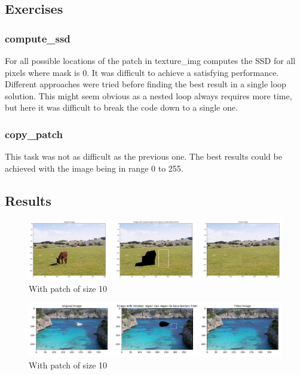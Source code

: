 \documentclass[12pt]{article}
\begin{document}
\subsection{Exercises}
\subsubsection{compute\_ssd}
For all possible locations of the patch in texture\_img computes the SSD for all pixels where mask is 0.
\newline
It was difficult to achieve a satisfying performance. Different approaches were tried before finding the best result
in a single loop solution. This might seem obvious as a nested loop always requires more time, but here it was difficult
to break the code down to a single one. 
\subsubsection{copy\_patch}
This task was not as difficult as the previous one. The best results could be achieved with the image being in range 0 to 255.
\subsection{Results}
\begin{figure}[!htb]
    \centering
    \includegraphics[width=.8\textwidth]{pics/donkey10}
    \caption{With patch of size 10}
    \end{figure}

    

    \begin{figure}[!htb]
        \centering
        \includegraphics[width=.8\textwidth]{pics/yacht10}
        \caption{With patch of size 10}
        \end{figure}
\end{document}

